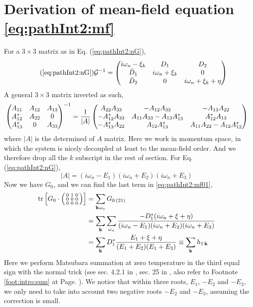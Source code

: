 \section{Derivation of  mean-field equation \eqref{eq:pathInt2:mf}\label{sec:pathInt2:deriveMF}}
For a $3\times3$ matrix as in Eq. (\ref{eq:pathInt2:nG}), 
\begin{equation}\tag{\ref{eq:pathInt2:nG}}
\mathcal{G}^{-1}=\begin{pmatrix}
i\omega_{n}-\xi_{k}&D_{1}&D_{2}\\
\bar{D}_{1}&i\omega_{n}+\xi_{k}&0\\
\bar{D}_{2}&0&i\omega_{n}+\xi_{k}+\eta
\end{pmatrix}
\end{equation}
A general $3\times3$ matrix inverted as such, 
  \begin{equation}
  \begin{pmatrix}A_{11}&A_{12}&A_{13}\\A_{12}^{*}&A_{22}&0\\A_{13}^{*}&0&A_{33}\end{pmatrix}^{-1}=
  \frac{1}{|A|}
  \begin{pmatrix}A_{22}A_{33}&-A_{12}A_{33}&-A_{13}A_{22}\\
  	-A_{12}^{*}A_{33}&A_{11}A_{33}-A_{13}A_{13}^{*}&A_{12}^{*}A_{13}\\
	-A_{13}^{*}A_{22}&A_{12}A_{13}^{*}&A_{11}A_{22}-A_{12}A_{12}^{*}\end{pmatrix}
  \end{equation}
where $|A|$ is the determined of $A$ matrix.  Here we work in momentum space, in which the system is nicely decoupled at least to the mean-field order.  And we therefore drop all the $k$ subscript in the rest of section.  For Eq. (\ref{eq:pathInt2:nG}),
\begin{equation}
|A|=(i\omega_{n}-E_{1})(i\omega_{n}+E_{2})(i\omega_{n}+E_{3})
\end{equation}
Now we have $G_{0}$, and we can find the last term in \ref{eq:pathInt2:mf01}, 
\begin{equation}
\begin{split}
\text{tr}\left[{G_{0}}\cdot\left(\begin{smallmatrix}0&1&0\\0&0&0\\0&0&0\end{smallmatrix}\right)\right]&=\sum_{\mathbf{k}\omega_{n}}G_{0\,(21)}\\
&=\sum_{\mathbf{k}}\sum_{\omega_{n}}\frac{-D_{1}^{*}(i\omega_{n}+\xi+\eta)}{(i\omega_{n}-E_{1})(i\omega_{n}+E_{2})(i\omega_{n}+E_{3})}\\
&=\sum_{\mathbf{k}}D_{1}^{*}\frac{E_{1}+\xi+\eta}{(E_{1}+E_{2})(E_{1}+E_{3})}\equiv\sum_{\mathbf{k}}h_{1\,\mathbf{k}}
\end{split}
\end{equation}
Here we perform Matsubara summation at zero temperature in the third equal sign with the normal trick (see sec. 4.2.1 in \cite{Altland}, sec. 25 in \cite{Fetter}, also refer to Footnote \ref{foot:intro:sum} at Page. \pageref{foot:intro:sum}).  We notice that within three roots, $E_{1}$, $-E_{2}$ and $-E_{3}$, we only need to take into account two negative roots $-E_{2}$ and $-E_{3}$, assuming the correction is small. 
